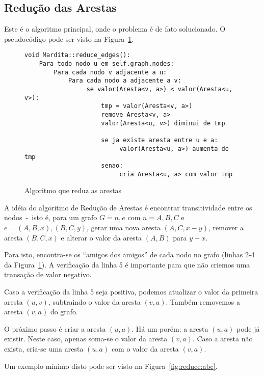 \documentclass[12pt]{article}
\begin{document}
\subsection{Redução das Arestas}\label{sec:algoritmo:reduce}

Este é o algoritmo principal, onde o problema é de fato solucionado. O
pseudocódigo pode ser visto na Figura~\ref{fig:algoritmo:reduce_edges}.

\begin{figure}[htb!]
  \centering
\begin{lstlisting}
void Mardita::reduce_edges():
    Para todo nodo u em self.graph.nodes:
        Para cada nodo v adjacente a u:
            Para cada nodo a adjacente a v:
                 se valor(Aresta<v, a>) < valor(Aresta<u, v>):
                     tmp = valor(Aresta<v, a>)
                     remove Aresta<v, a>
                     valor(Aresta<u, v>) diminui de tmp

                     se ja existe aresta entre u e a:
                          valor(Aresta<u, a>) aumenta de tmp
                     senao:
                          cria Aresta<u, a> com valor tmp
\end{lstlisting}
  \caption{Algoritmo que reduz as arestas}
\label{fig:algoritmo:reduce_edges}
\end{figure}

A idéia do algoritmo de Redução de Arestas é encontrar transitividade entre os
nodos~-~isto é, para um grafo $G = {n, e}$ com $n = {A, B, C}$ e $e = {(A, B, x),
  (B, C, y)}$, gerar uma nova aresta $(A, C, x - y)$, remover a aresta $(B, C,
x)$ e alterar o valor da aresta $(A, B)$ para $y - x$.

Para isto, encontra-se os ``amigos dos amigos'' de cada nodo no grafo (linhas
2-4 da Figura~\ref{fig:algoritmo:reduce_edges}). A verificação da linha 5 é
importante para que não criemos uma transação de valor negativo.

Caso a verificação da linha 5 seja positiva, podemos atualizar o valor da
primeira aresta $(u, v)$, subtraindo o valor da aresta $(v, a)$. Também
removemos a aresta $(v, a)$ do grafo.

O próximo passo é criar a aresta $(u, a)$. Há um porém: a aresta $(u, a)$ pode
já existir. Neste caso, apenas soma-se o valor da aresta $(v, a)$. Caso a aresta
não exista, cria-se uma aresta $(u, a)$ com o valor da aresta $(v, a)$.

Um exemplo mínimo disto pode ser visto na Figura~\ref{fig:reduce:abc}.
\end{document}
